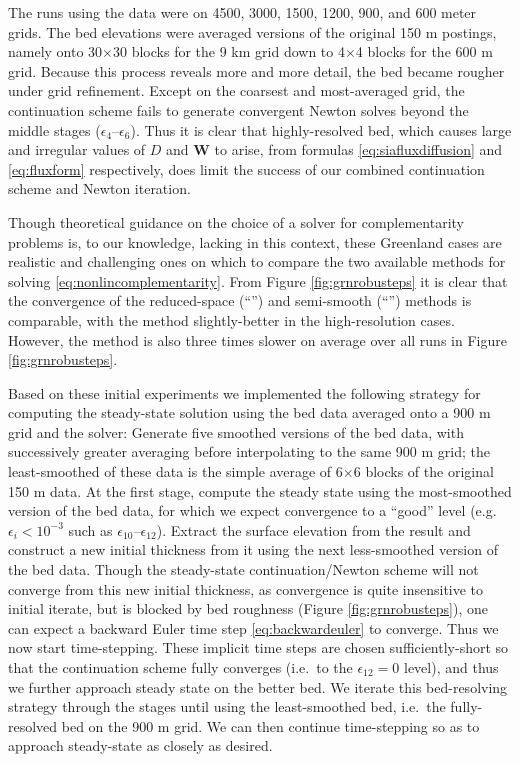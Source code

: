 \documentclass[twocolumn,letterpaper]{igs}
\newcommand\bW{\mathbf{W}}
\newcommand\eps{\epsilon}
\begin{document}
The runs using the \MCB data were on 4500, 3000, 1500, 1200, 900, and 600 meter grids.  The bed elevations were averaged versions of the original 150 m postings, namely onto 30$\times$30 blocks for the 9 km grid down to 4$\times$4 blocks for the 600 m grid.  Because this process reveals more and more detail, the bed became rougher under grid refinement.  Except on the coarsest and most-averaged grid, the continuation scheme fails to generate convergent Newton solves beyond the middle stages ($\eps_4$--$\eps_6$).  Thus it is clear that highly-resolved bed, which causes large and irregular values of $D$ and $\bW$ to arise, from formulas \eqref{eq:siafluxdiffusion} and \eqref{eq:fluxform} respectively, does limit the success of our combined continuation scheme and Newton iteration.

Though theoretical guidance on the choice of a solver for complementarity problems is, to our knowledge, lacking in this context, these Greenland cases are realistic and challenging ones on which to compare the two available methods for solving \eqref{eq:nonlincomplementarity}.  From Figure \ref{fig:grnrobusteps} it is clear that the convergence of the reduced-space (``\virs'') and semi-smooth (``\viss'') methods \citep{BensonMunson2006} is comparable, with the \virs method slightly-better in the high-resolution cases.  However, the \viss method is also three times slower on average over all runs in Figure \ref{fig:grnrobusteps}.

Based on these initial experiments we implemented the following strategy for computing the steady-state solution using the \MCB bed data averaged onto a 900 m grid and the \virs solver:  Generate five smoothed versions of the bed data, with successively greater averaging before interpolating to the same 900 m grid; the least-smoothed of these data is the simple average of 6$\times$6 blocks of the original 150 m data.  At the first stage, compute the steady state using the most-smoothed version of the bed data, for which we expect convergence to a ``good'' level (e.g.~$\eps_i<10^{-3}$ such as $\eps_{10}$--$\eps_{12}$).  Extract the surface elevation from the result and construct a new initial thickness from it using the next less-smoothed version of the bed data.  Though the steady-state continuation/Newton scheme will not converge from this new initial thickness, as convergence is quite insensitive to initial iterate, but is blocked by bed roughness (Figure \ref{fig:grnrobusteps}), one can expect a backward Euler time step \eqref{eq:backwardeuler} to converge.  Thus we now start time-stepping.  These implicit time steps are chosen sufficiently-short so that the continuation scheme fully converges (i.e.~to the $\eps_{12}=0$ level), and thus we further approach steady state on the better bed.  We iterate this bed-resolving strategy through the stages until using the least-smoothed bed, i.e.~the fully-resolved bed on the 900 m grid.  We can then continue time-stepping so as to approach steady-state as closely as desired.
\end{document}
